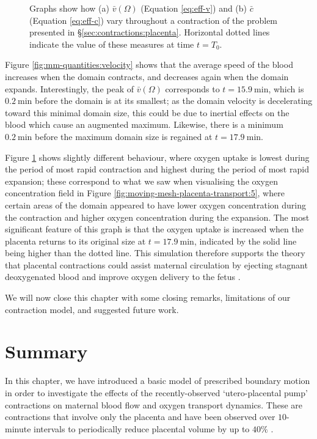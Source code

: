 \begin{figure}
\begin{subfigure}{0.45\textwidth}
                    \caption{}
                    \label{fig:mm-quantities:uptake}
                \end{subfigure}
                \caption{Graphs show how (a) $\bar{v}(\Omega)$ (Equation \eqref{eq:eff-v}) and (b) $\bar{c}$ (Equation \eqref{eq:eff-c}) vary throughout a contraction of the problem presented in \S\ref{sec:contractions:placenta}. Horizontal dotted lines indicate the value of these measures at time $t = T_0$.}
                \label{fig:mm-quantities}
            \end{figure}

            Figure \ref{fig:mm-quantities:velocity} shows that the average speed of the blood increases when the domain contracts, and decreases again when the domain expands. Interestingly, the peak of $\bar{v}(\Omega)$ corresponds to $t = \qty{15.9}{\minute}$, which is $\qty{0.2}{\minute}$ before the domain is at its smallest; as the domain velocity is decelerating toward this minimal domain size, this could be due to inertial effects on the blood which cause an augmented maximum. Likewise, there is a minimum $\qty{0.2}{\minute}$ before the maximum domain size is regained at $t = \qty{17.9}{\minute}$.
            
            Figure \ref{fig:mm-quantities:uptake} shows slightly different behaviour, where oxygen uptake is lowest during the period of most rapid contraction and highest during the period of most rapid expansion; these correspond to what we saw when visualising the oxygen concentration field in Figure \ref{fig:moving-mesh-placenta-transport:5}, where certain areas of the domain appeared to have lower oxygen concentration during the contraction and higher oxygen concentration during the expansion. The most significant feature of this graph is that the oxygen uptake is increased when the placenta returns to its original size at $t = \qty{17.9}{\minute}$, indicated by the solid line being higher than the dotted line. This simulation therefore supports the theory that placental contractions could assist maternal circulation by ejecting stagnant deoxygenated blood and improve oxygen delivery to the fetus \cite{dellschaftHaemodynamicsHumanPlacenta2020}.

            We will now close this chapter with some closing remarks, limitations of our contraction model, and suggested future work.

    \section{Summary} \label{sec:contractions:summary}
        In this chapter, we have introduced a basic model of prescribed boundary motion in order to investigate the effects of the recently-observed `utero-placental pump' contractions on maternal blood flow and oxygen transport dynamics. These are contractions that involve only the placenta and have been observed over $10$-minute intervals to periodically reduce placental volume by up to $40\%$ \cite{dellschaftHaemodynamicsHumanPlacenta2020}.

